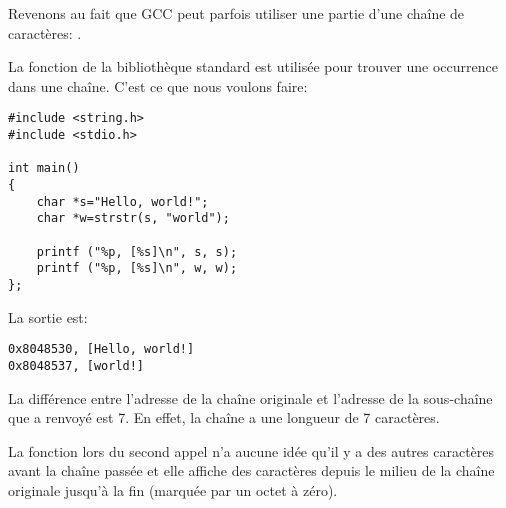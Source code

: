 \label{strstr_example}

Revenons au fait que GCC peut parfois utiliser une partie d'une chaîne de caractères:
.

La fonction  de la bibliothèque standard \CCpp est utilisée pour trouver
une occurrence dans une chaîne. C'est ce que nous voulons faire:

\begin{lstlisting}[style=customc]
#include <string.h>
#include <stdio.h>

int main()
{
	char *s="Hello, world!";
	char *w=strstr(s, "world");

	printf ("%p, [%s]\n", s, s);
	printf ("%p, [%s]\n", w, w);
};
\end{lstlisting}

La sortie est:

\begin{lstlisting}
0x8048530, [Hello, world!]
0x8048537, [world!]
\end{lstlisting}

La différence entre l'adresse de la chaîne originale et l'adresse de la sous-chaîne
que  a renvoyé est 7.
En effet, la chaîne  a une longueur de 7 caractères.

La fonction \printf{} lors du second appel n'a aucune idée qu'il y a des autres caractères
avant la chaîne passée et elle affiche des caractères depuis le milieu de la chaîne
originale jusqu'à la fin (marquée par un octet à zéro).

